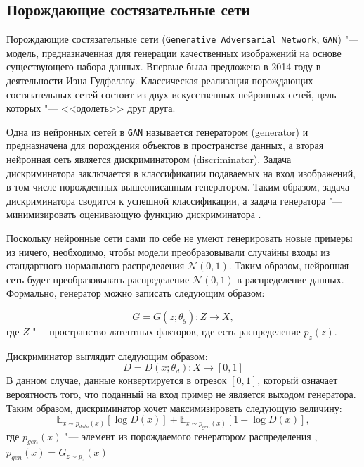 \subsection{Порождающие состязательные сети}
Порождающие состязательные сети (\texttt{Generative Adversarial Network}, \texttt{GAN}) "--- модель, предназначенная для генерации качественных изображений на основе существующего набора данных. Впервые была предложена в 2014 году в деятельности Иэна Гудфеллоу. Классическая реализация порождающих состязательных сетей состоит из двух искусственных нейронных сетей, цель которых "--- <<одолеть>> друг друга.

Одна из нейронных сетей в \texttt{GAN} называется генератором (generator) и предназначена для порождения объектов в пространстве данных, а вторая нейронная сеть является дискриминатором (discriminator). Задача дискриминатора заключается в классификации подаваемых на вход изображений, в том числе порожденных вышеописанным генератором. Таким образом, задача дискриминатора сводится к успешной классификации, а задача генератора "--- минимизировать оценивающую функцию дискриминатора \cite{gan_intro}.

Поскольку нейронные сети сами по себе не умеют генерировать новые примеры из ничего, необходимо, чтобы модели преобразовывали случайны входы из стандартного нормального распределения $\mathcal{N}(0, 1)$. Таким образом, нейронная сеть будет преобразовывать распределение $\mathcal{N}(0, 1)$ в распределение данных. Формально, генератор можно записать следующим образом:


\begin{equation}
    G = G(z; \theta_g): Z \rightarrow X,
\end{equation}
где $Z$ "--- пространство латентных факторов, где есть распределение $p_z(z)$. 

Дискриминатор выглядит следующим образом:
\begin{equation}
    D = D(x; \theta_d): X \rightarrow [0, 1]
\end{equation}
В данном случае, данные конвертируется в отрезок $[0, 1]$, который означает вероятность того, что поданный на вход пример не является выходом генератора. Таким образом, дискриминатор хочет максимизировать следующую величину:
\begin{equation}
    \mathbb{E}_{x \sim p_{data}(x)}[\log D(x)] + \mathbb{E}_{x \sim p_{gen}(x)}[1 - \log D(x)],
\end{equation}
где $p_{gen}(x)$ "--- элемент из порождаемого генератором распределения ,$p_{gen}(x) = G_{z \sim p_z}(x)$

